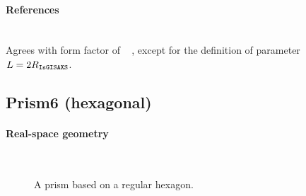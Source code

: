 \paragraph{References}\strut\\
Agrees with  form factor of \IsGISAXS\
\cite[Eq.~2.29]{Laz08} \cite[Eq.~219]{ReLL09},
except for the definition of parameter $L= 2 R_{\rm{\texttt{IsGISAXS}}}$.

\clearpage
\subsection{Prism6 (hexagonal)} \label{sec:Prism6}

\paragraph{Real-space geometry}\strut\\

\begin{figure}[H]
\hfill
{}
\hfill
{}
\hfill
{}
\hfill
\caption{A prism based on a regular hexagon.}
\end{figure}


